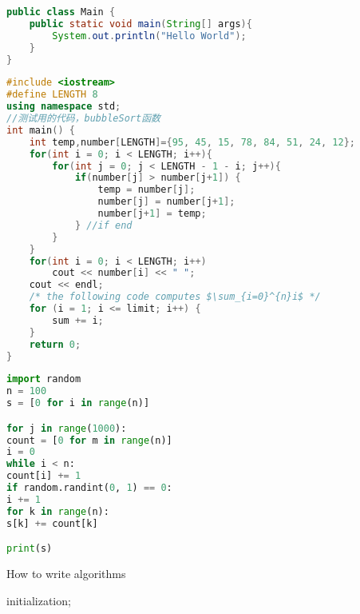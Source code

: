 \documentclass[UTF8, onecolumn, a4paper]{article}
\begin{document}
	
\begin{lstlisting}[language={java}, title={helloWorld.java}]
public class Main {
	public static void main(String[] args){
		System.out.println("Hello World");
	}
}
\end{lstlisting}

\begin{lstlisting}[language={c++}, title={bubbleSort.c},mathescape] 
#include <iostream>  
#define LENGTH 8  
using namespace std;  
//测试用的代码，bubbleSort函数  
int main() {  
	int temp,number[LENGTH]={95, 45, 15, 78, 84, 51, 24, 12};  
	for(int i = 0; i < LENGTH; i++){  
		for(int j = 0; j < LENGTH - 1 - i; j++){  
			if(number[j] > number[j+1]) {  
				temp = number[j];  
				number[j] = number[j+1];  
				number[j+1] = temp;  
			} //if end  
		}
	}
	for(int i = 0; i < LENGTH; i++) 
		cout << number[i] << " ";  
	cout << endl;
	/* the following code computes $\sum_{i=0}^{n}i$ */
	for (i = 1; i <= limit; i++) {
		sum += i;
	}
	return 0;  
}
\end{lstlisting}

\begin{lstlisting}[language={python}, title={test.py}]
import random
n = 100
s = [0 for i in range(n)]

for j in range(1000):
count = [0 for m in range(n)]
i = 0
while i < n:
count[i] += 1
if random.randint(0, 1) == 0:
i += 1
for k in range(n):
s[k] += count[k]

print(s)
\end{lstlisting}
	
	\begin{algorithm}[H]
		\caption{How to write algorithms}
		initialization;\\
	\end{algorithm}
\end{document}
